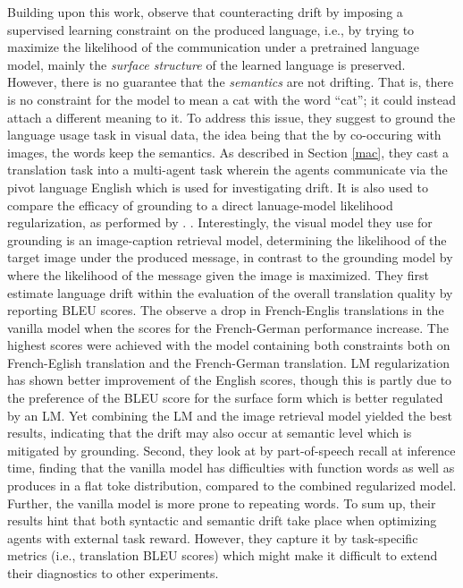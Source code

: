 Building upon this work, \cite{lee2019countering} observe that counteracting drift by imposing a supervised learning constraint on the produced language, i.e., by trying to maximize the likelihood of the communication under a pretrained language model, mainly the \textit{surface structure} of the learned language is preserved. However, there is no guarantee that the \textit{semantics} are not drifting. That is, there is no constraint for the model to mean a cat with the word ``cat''; it could instead attach a different meaning to it.  To address this issue, they suggest to ground the language usage task in visual data, the idea being that the by co-occuring with images, the words keep the semantics. As described in Section \ref{mac}, they cast a translation task into a multi-agent task wherein the agents communicate via the pivot language English which is used for investigating drift. It is also used to compare the efficacy of grounding to a direct lanuage-model likelihood regularization, as performed by \cite{lewis2017deal}. . Interestingly, the visual model they use for grounding is an image-caption retrieval model, determining the likelihood of the target image under the produced message, in  contrast to the grounding model by \cite{lazaridou2020multi} where the likelihood of the message given the image is maximized.
They first estimate language drift within the evaluation of the overall translation quality by reporting BLEU scores. The observe a drop in French-Englis translations in the vanilla model when the scores for the French-German performance increase. The highest scores were achieved with the model containing both constraints both on French-Eglish translation and the French-German translation. LM regularization has shown better improvement of the English scores, though this is partly due to the preference of the BLEU score for the surface form which is better regulated by an LM. Yet combining the LM and the image retrieval model yielded the best results, indicating that the drift may also occur at semantic level which is mitigated by grounding. Second, they look at by part-of-speech recall at inference time, finding that the vanilla model has difficulties with function words as well as produces in a flat toke distribution, compared to the combined regularized model. Further, the vanilla model is more prone to repeating words. To sum up, their results hint that both syntactic and semantic drift take place when optimizing agents with external task reward. However, they capture it by task-specific metrics (i.e., translation BLEU scores) which might make it difficult to extend their diagnostics to other experiments.

